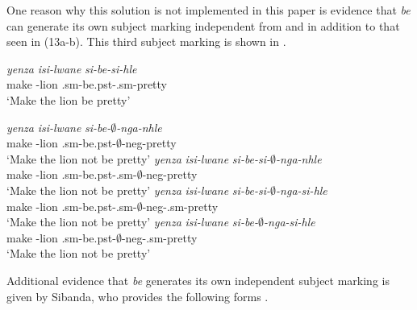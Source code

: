 \documentclass[output=paper]{langsci/langscibook}
\newcommand{\bee}[0]{\textit{be }}
\begin{document}
One reason why this solution is not implemented in this paper is evidence that \bee can generate its own subject marking independent from and in addition to that seen in  (13a-b). This third subject marking is shown in .



\begin{exe}
\ex\label{ex:burkholder:18} \begin{xlist}
\ex\label{ex:burkholder:18a} \gll  \textit{yenza} \textit{isi-lwane} \textit{si-be-si-hle}\\
       make -lion .{\sc sm}-be.{\sc pst}-.{\sc sm}-pretty\\
    \glt `Make the lion be pretty'

\ex\label{ex:burkholder:18b} \gll  \textit{yenza} \textit{isi-lwane} \textit{si-be-$\emptyset$-nga-nhle}\\
       make -lion .{\sc sm}-be.{\sc pst}-$\emptyset$-{\sc neg}-pretty\\
    \glt `Make the lion not be pretty' 
\ex\label{ex:burkholder:18c} \gll  \textit{yenza} \textit{isi-lwane} \textit{si-be-si-$\emptyset$-nga-nhle}\\
       make -lion .{\sc sm}-be.{\sc pst}-.{\sc sm}-$\emptyset$-{\sc neg}-pretty\\
    \glt `Make the lion not be pretty' 
\ex\label{ex:burkholder:18d} \gll  \textit{yenza} \textit{isi-lwane} \textit{si-be-si-$\emptyset$-nga-si-hle}\\
       make -lion .{\sc sm}-be.{\sc pst}-.{\sc sm}-$\emptyset$-{\sc neg}-.{\sc sm}-pretty\\
    \glt `Make the lion not be pretty' 
\ex\label{ex:burkholder:18e} \gll  *\textit{yenza} \textit{isi-lwane} \textit{si-be-$\emptyset$-nga-si-hle}\\
       make -lion .{\sc sm}-be.{\sc pst}-$\emptyset$-{\sc neg}-.{\sc sm}-pretty\\
    \glt `Make the lion not be pretty' 
\end{xlist}
\end{exe}

Additional evidence that \bee generates its own independent subject marking is given by Sibanda, who provides the following forms \citep{Sibanda2004}.
\end{document}
